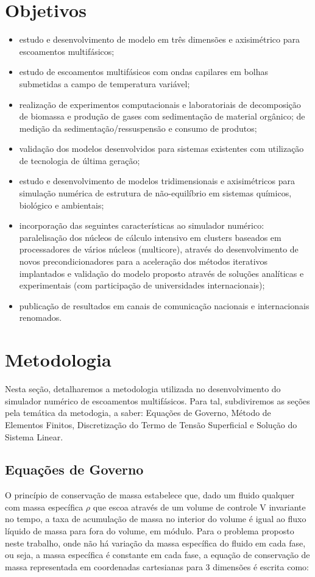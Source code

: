 \documentclass[a4paper,portuges,12pt]{article}
\begin{document}
\section{Objetivos}
\begin{itemize}
	\item estudo e desenvolvimento de modelo em três dimensões e axisimétrico
	      para escoamentos multifásicos;
	\item estudo de escoamentos multifásicos com ondas capilares em bolhas
	      submetidas a campo de temperatura variável;
	\item realização de experimentos computacionais e laboratoriais de
		  decomposição de biomassa e produção de gases com sedimentação
		  de material orgânico; de medição da sedimentação/ressuspensão
		  e consumo de produtos;
	\item validação dos modelos desenvolvidos para sistemas existentes com
	      utilização de tecnologia de última geração;
	\item estudo e desenvolvimento de modelos tridimensionais e axisimétricos
		  para simulação numérica de estrutura de não-equilíbrio em
		  sistemas químicos, biológico e ambientais;
	\item incorporação das seguintes características ao simulador numérico:
		  paralelisação dos núcleos de cálculo intensivo em clusters
		  baseados em processadores de vários núcleos (multicore),
		  através do desenvolvimento de novos precondicionadores para a
		  aceleração dos métodos iterativos implantados e validação do
		  modelo proposto através de soluções analíticas e experimentais
		  (com participação de universidades internacionais);
	\item publicação de resultados em canais de comunicação nacionais e
	      internacionais renomados.
\end{itemize}

\section{Metodologia}
Nesta seção, detalharemos a metodologia utilizada no desenvolvimento do
simulador numérico de escoamentos multifásicos. Para tal, subdiviremos
as seções pela temática da metodogia, a saber: Equações de Governo,
Método de Elementos Finitos, Discretização do Termo de Tensão
Superficial e Solução do Sistema Linear.

\subsection{Equações de Governo}
O princípio de conservação de massa estabelece que, dado um fluido
qualquer com massa específica $\rho$ que escoa através de um volume de
controle V invariante no tempo, a taxa de acumulação de massa no
interior do volume é igual ao fluxo líquido de massa para fora do
volume, em módulo. Para o problema proposto neste trabalho, onde não há
variação da massa específica do fluido em cada fase, ou seja, a massa
específica é constante em cada fase, a equação de conservação de massa
representada em coordenadas cartesianas para 3 dimensões é escrita como:
\end{document}
